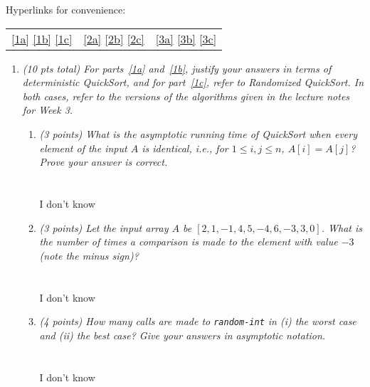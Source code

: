 \documentclass[12pt]{article}
\begin{document}
\renewcommand{\headrulewidth}{0.5pt}

\phantom{Test}

Hyperlinks for convenience:
\begin{tabular}{lll}
\ref{1a} \ref{1b} \ref{1c} &
\ref{2a} \ref{2b} \ref{2c} &
\ref{3a} \ref{3b} \ref{3c}
\end{tabular}

\begin{enumerate}

	\item {\itshape (10 pts total) 
	For parts~\eqref{1a} and~\eqref{1b}, justify your answers in terms of deterministic QuickSort, and for part~\eqref{1c}, refer to Randomized QuickSort. In both cases, refer to the versions of the algorithms given in the lecture notes for Week 3.}
	\begin{enumerate}
	\item {\itshape \label{1a} (3 points) What is the asymptotic running time of QuickSort when every element of the input $A$ is identical, i.e., for $1\leq i,j \leq n$, $A[i] = A[j]$? Prove your answer is correct.}
	\\ \\ \\ I don't know
	\pagebreak
	
	\item {\itshape \label{1b} (3 points) Let the input array $A$ be $[2, 1, -1, 4, 5, -4, 6, -3, 3, 0]$. What is the number of times a comparison is made to the element with value $-3$ (note the minus sign)?}
	\\ \\ \\ I don't know
	\pagebreak
	
	\item {\itshape \label{1c} (4 points) How many calls are made to {\tt random-int} in (i) the worst case and (ii) the best case? Give your answers in asymptotic notation.}
	\\ \\ \\ I don't know
	\pagebreak
	
	\end{enumerate}


\end{enumerate}
\end{document}

